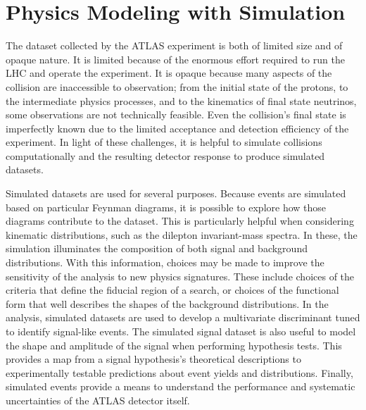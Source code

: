 \section{Physics Modeling with Simulation} \label{sec:phenoSim}

The dataset collected by the ATLAS experiment is both of limited size and of opaque nature.
It is limited because of the enormous effort required to run the LHC and operate the experiment.
It is opaque because many aspects of the collision are inaccessible to observation; from the initial state of the protons, to the intermediate physics processes, and to the kinematics of final state neutrinos, some observations are not technically feasible.
Even the collision's final state is imperfectly known due to the limited acceptance and detection efficiency of the experiment.
In light of these challenges, it is helpful to simulate collisions computationally and the resulting detector response to produce simulated datasets.

Simulated datasets are used for several purposes.
Because events are simulated based on particular Feynman diagrams, it is possible to explore how those diagrams contribute to the dataset.
This is particularly helpful when considering kinematic distributions, such as the dilepton invariant-mass spectra.
In these, the simulation illuminates the composition of both signal and background distributions.
With this information, choices may be made to improve the sensitivity of the analysis to new physics signatures.
These include choices of the criteria that define the fiducial region of a search, or choices of the functional form that well describes the shapes of the background distributions.
In the \hmm analysis, simulated datasets are used to develop a multivariate discriminant tuned to identify signal-like events.
The simulated signal dataset is also useful to model the shape and amplitude of the signal when performing hypothesis tests.
This provides a map from a signal hypothesis's theoretical descriptions to experimentally testable predictions about event yields and distributions.
Finally, simulated events provide a means to understand the performance and systematic uncertainties of the ATLAS detector itself.

